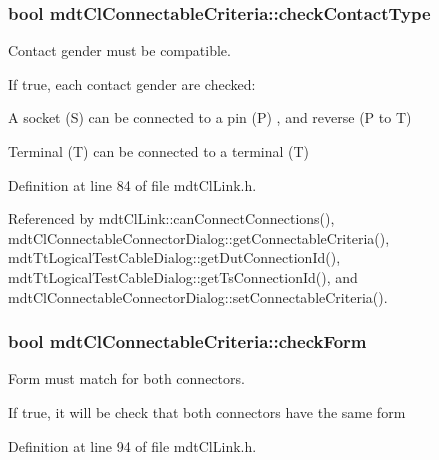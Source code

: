 \hypertarget{structmdt_cl_connectable_criteria_ad37109313f47acdc63331bd744df38a4}{
\subsubsection[{check\-Contact\-Type}]{\setlength{\rightskip}{0pt plus 5cm}bool mdt\-Cl\-Connectable\-Criteria\-::check\-Contact\-Type}}\label{structmdt_cl_connectable_criteria_ad37109313f47acdc63331bd744df38a4}


Contact gender must be compatible. 

If true, each contact gender are checked\-:
\begin{DoxyItemize}
\item A socket (S) can be connected to a pin (P) , and reverse (P to T)
\item Terminal (T) can be connected to a terminal (T) 
\end{DoxyItemize}

Definition at line 84 of file mdt\-Cl\-Link.\-h.



Referenced by mdt\-Cl\-Link\-::can\-Connect\-Connections(), mdt\-Cl\-Connectable\-Connector\-Dialog\-::get\-Connectable\-Criteria(), mdt\-Tt\-Logical\-Test\-Cable\-Dialog\-::get\-Dut\-Connection\-Id(), mdt\-Tt\-Logical\-Test\-Cable\-Dialog\-::get\-Ts\-Connection\-Id(), and mdt\-Cl\-Connectable\-Connector\-Dialog\-::set\-Connectable\-Criteria().

\hypertarget{structmdt_cl_connectable_criteria_ad4487b3b17f90f28023afefbfde78842}{
\subsubsection[{check\-Form}]{\setlength{\rightskip}{0pt plus 5cm}bool mdt\-Cl\-Connectable\-Criteria\-::check\-Form}}\label{structmdt_cl_connectable_criteria_ad4487b3b17f90f28023afefbfde78842}


Form must match for both connectors. 

If true, it will be check that both connectors have the same form 

Definition at line 94 of file mdt\-Cl\-Link.\-h.



